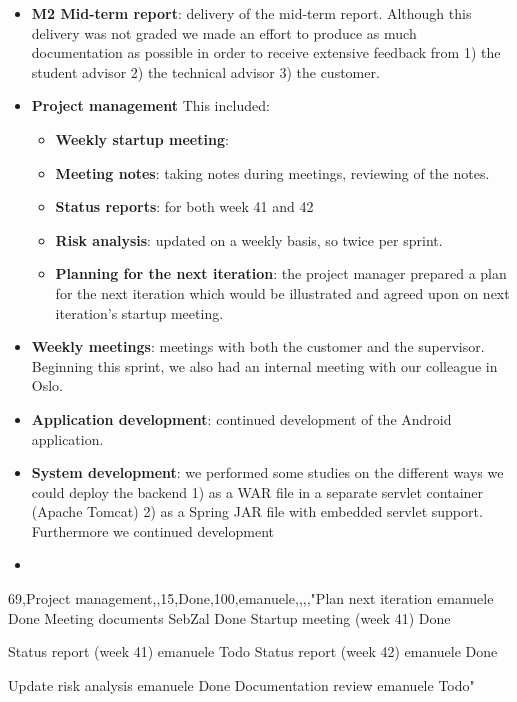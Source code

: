 \begin{itemize}
\item \textbf{M2 Mid-term report}:
	delivery of the mid-term report. Although this delivery was not graded we made an effort
	to produce as much documentation as possible in order to receive extensive feedback from
	1) the student advisor 2) the technical advisor 3) the customer.
\item \textbf{Project management}\newline
	This included:
	\begin{itemize}
		\item \textbf{Weekly startup meeting}: 
		\item \textbf{Meeting notes}:
			taking notes during meetings, reviewing of the notes.
		\item \textbf{Status reports}:
			for both week 41 and 42
		\item \textbf{Risk analysis}:
			updated on a weekly basis, so twice per sprint.
		\item \textbf{Planning for the next iteration}:
			the project manager prepared a plan for the next iteration
			which would be illustrated and agreed upon on next iteration's startup meeting.
	\end{itemize}
	\item \textbf{Weekly meetings}: 
		meetings with both the customer and the supervisor. Beginning this sprint, we also
		had an internal meeting with our colleague in Oslo.
	\item \textbf{Application development}:
		continued development of the Android application.
	\item \textbf{System development}:
		we performed some studies on the different ways we could deploy the backend
		1) as a WAR file in a separate servlet container (Apache Tomcat) 2) as a Spring JAR file
		with embedded servlet support. Furthermore we continued development
	\item \textbf{}
	
\end{itemize}



69,Project management,,15,Done,100,emanuele,,,,"Plan next iteration	emanuele	Done
Meeting documents	SebZal	Done
Startup meeting (week 41)	Done

Status report (week 41)	emanuele	Todo
Status report (week 42)	emanuele	Done

Update risk analysis	emanuele	Done
Documentation review	emanuele	Todo"

